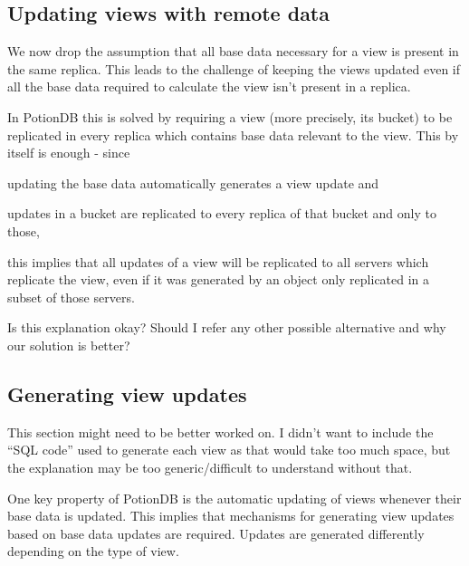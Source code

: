\documentclass{vldb}
\newcommand{\grumbler}[2]{{\color{red}{\bf #1:} #2}}
\newcommand{\andre}[1]{\grumbler{andre}{#1}}
\begin{document}
\subsection{Updating views with remote data}

We now drop the assumption that all base data necessary for a view is present in the same replica.
This leads to the challenge of keeping the views updated even if all the base data required to calculate the view isn't present in a replica.

In PotionDB this is solved by requiring a view (more precisely, its bucket) to be replicated in every replica which contains base data relevant to the view.
This by itself is enough - since 
\begin{enumerate*}[label=(\roman*)]
	\item updating the base data automatically generates a view update and
	\item updates in a bucket are replicated to every replica of that bucket and only to those,
\end{enumerate*}
this implies that all updates of a view will be replicated to all servers which replicate the view, even if it was generated by an object only replicated in a subset of those servers.

\andre{Is this explanation okay? Should I refer any other possible alternative and why our solution is better?}

\subsection{Generating view updates}

\andre{This section might need to be better worked on. I didn't want to include the ``SQL code'' used to generate each view as that would take too much space, but the explanation may be too generic/difficult to understand without that.}

One key property of PotionDB is the automatic updating of views whenever their base data is updated.
This implies that mechanisms for generating view updates based on base data updates are required.
Updates are generated differently depending on the type of view.
\end{document}
